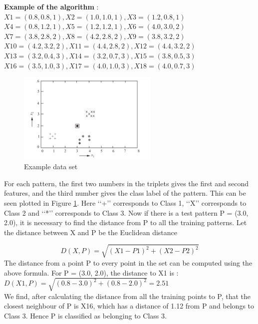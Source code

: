 \vspace{5mm}
\textbf{Example of the algorithm} :\newline 
$ X1 = (0.8, 0.8, 1), X2 = (1.0, 1.0, 1), X3 = (1.2, 0.8, 1)$\\
$X4 = (0.8, 1.2, 1), X5 = (1.2, 1.2, 1), X6 = (4.0, 3.0, 2)$\\
$X7 = (3.8, 2.8, 2), X8 = (4.2, 2.8, 2), X9 = (3.8, 3.2, 2)$\\
$X10 = (4.2, 3.2, 2), X11 = (4.4, 2.8, 2), X12 = (4.4, 3.2, 2)$\\
$X13 = (3.2, 0.4, 3), X14 = (3.2, 0.7, 3), X15 = (3.8, 0.5, 3)$\\
$X16 = (3.5, 1.0, 3), X17 = (4.0, 1.0, 3), X18 = (4.0, 0.7, 3)$


\begin{figure}[H]
\centering
\includegraphics[width=0.6\textwidth]{img/nn-example.PNG}
\caption{ Example data set }
\label{fig:NN}
\end{figure}

For each pattern, the first two numbers in the triplets gives the first and second
features, and the third number gives the class label of the pattern.
This can be seen plotted in Figure \ref{fig:NN}. Here ‘‘+’’ corresponds to Class 1, ‘‘X’’
corresponds to Class 2 and ‘‘*’’ corresponds to Class 3.
Now if there is a test pattern P = (3.0, 2.0), it is necessary to find the distance
from P to all the training patterns.
Let the distance between X and P be the Euclidean distance

$$D(X,P) = \sqrt{(X1 - P1)^{2} + (X2 - P2 )^{2} }$$
\newline
The distance from a point P to every point in the set can be computed using the above formula. For P = (3.0, 2.0), the distance to X1 is :
$D(X1,P) = \sqrt{(0.8 - 3.0)^{2} + (0.8 - 2.0 )^{2} } = 2.51 $ \\
We find, after calculating the distance from all the training points to P, that the closest
neighbour of P is X16, which has a distance of 1.12 from P and belongs to Class 3.
Hence P is classified as belonging to Class 3.
